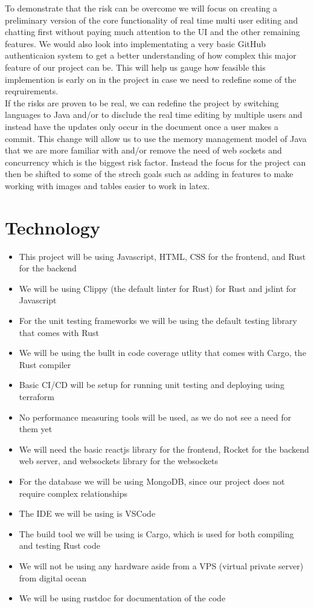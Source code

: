 \documentclass{article}
\begin{document}
To demonstrate that the risk can be overcome we will focus on creating a preliminary version of the core functionality of real time multi user editing and chatting first without paying much attention to the UI and the other remaining features.
We would also look into implementating a very basic GitHub authenticaion system to get a better understanding of how complex this major feature of our project can be.  This will help us gauge how feasible this implemention is early on in the 
project in case we need to redefine some of the reqruirements.\\

If the risks are proven to be real, we can redefine the project by switching languages to Java and/or to disclude the real time editing by multiple users and instead have the updates only occur in the document once a user makes a commit. 
This change will allow us to use the memory management model of Java that we are more familiar with and/or remove the need of web sockets and concurrency which is the biggest risk factor. Instead the focus for the project can then be 
shifted to some of the strech goals such as adding in features to make working with images and tables easier to work in latex.

\section{Technology}

\begin{itemize}
\item This project will be using Javascript, HTML, CSS for the frontend, and Rust for the backend
\item We will be using Clippy (the default linter for Rust) for Rust and jslint for Javascript
\item For the unit testing frameworks we will be using the default testing library that comes with Rust
\item We will be using the bullt in code coverage utlity that comes with Cargo, the Rust compiler
\item Basic CI/CD will be setup for running unit testing and deploying using terraform
\item No performance measuring tools will be used, as we do not see a need for them yet
\item We will need the basic reactjs library for the frontend, Rocket for the backend web server, and websockets library for the websockets
\item For the database we will be using MongoDB, since our project does not require complex relationships
\item The IDE we will be using is VSCode
\item The build tool we will be using is Cargo, which is used for both compiling and testing Rust code
\item We will not be using any hardware aside from a VPS (virtual private server) from digital ocean
\item We will be using rustdoc for documentation of the code
\end{itemize}
\end{document}
